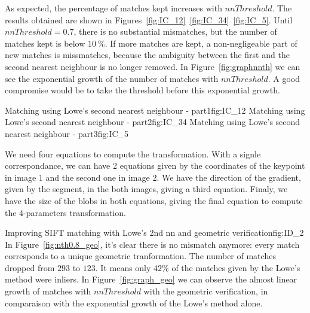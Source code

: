 \documentclass{article}
\begin{document}

As expected, the percentage of matches kept increases with \( nnThreshold\). The results obtained are shown in Figures~\ref{fig:IC_12}~\ref{fig:IC_34}~\ref{fig:IC_5}. Until \( nnThreshold = 0.7\), there is no substantial mismatches, but the number of matches kept is below \( 10~\%\). If more matches are kept, a non-negligeable part of new matches is missmatches, because the ambiguity between the first and the second nearest neighbour is no longer removed. In Figure~\ref{fig:graphnnth} we can see the exponential growth of the number of matches with \( nnThreshold \). A good compromise would be to take the threshold before this exponential growth.

{}
{Matching using Lowe's second nearest neighbour - part1}{fig:IC_12}
{}
{Matching using Lowe's second nearest neighbour - part2}{fig:IC_34}
{}
{Matching using Lowe's second nearest neighbour - part3}{fig:IC_5}


We need four equations to compute the transformation. With a signle correspondance, we can have 2 equations given by the coordinates of the keypoint in image 1 and the second one in image 2. We have the direction of the gradient, given by the segment, in the both images, giving a third equation. Finaly, we have the size of the blobs in both equations, giving the final equation to compute the 4-parameters transformation.


{}
{Improving SIFT matching with Lowe's 2nd nn and geometric verification}{fig:ID_2}
In Figure~\ref{fig:nth0.8_geo}, it's clear there is no mismatch anymore: every match corresponds to a unique geometric tranformation. The number of matches dropped from \( 293\) to \( 123\). It means only \( 42\%\) of the matches given by the Lowe's method were inliers. In Figure~\ref{fig:graph_geo} we can observe the almost linear growth of matches with \( nnThreshold\) with the geometric verification, in comparaison with the exponential growth of the Lowe's method alone.
\end{document}
